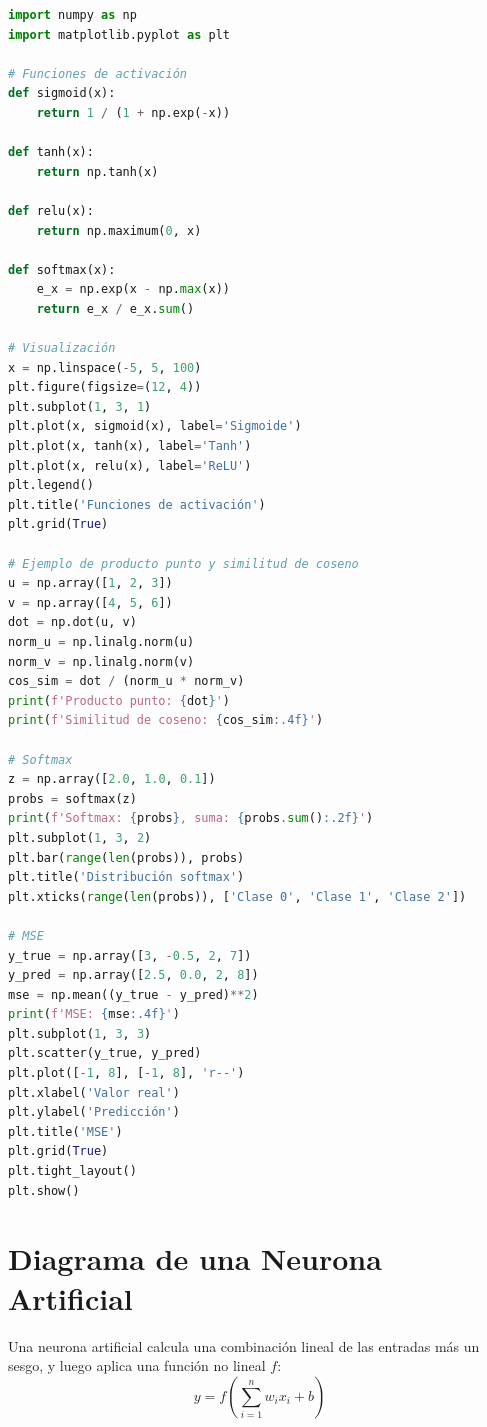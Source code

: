 \documentclass[12pt,a4paper,openany,oneside]{book}
\begin{document}
\begin{lstlisting}[language=Python]
import numpy as np
import matplotlib.pyplot as plt

# Funciones de activación
def sigmoid(x):
    return 1 / (1 + np.exp(-x))

def tanh(x):
    return np.tanh(x)

def relu(x):
    return np.maximum(0, x)

def softmax(x):
    e_x = np.exp(x - np.max(x))
    return e_x / e_x.sum()

# Visualización
x = np.linspace(-5, 5, 100)
plt.figure(figsize=(12, 4))
plt.subplot(1, 3, 1)
plt.plot(x, sigmoid(x), label='Sigmoide')
plt.plot(x, tanh(x), label='Tanh')
plt.plot(x, relu(x), label='ReLU')
plt.legend()
plt.title('Funciones de activación')
plt.grid(True)

# Ejemplo de producto punto y similitud de coseno
u = np.array([1, 2, 3])
v = np.array([4, 5, 6])
dot = np.dot(u, v)
norm_u = np.linalg.norm(u)
norm_v = np.linalg.norm(v)
cos_sim = dot / (norm_u * norm_v)
print(f'Producto punto: {dot}')
print(f'Similitud de coseno: {cos_sim:.4f}')

# Softmax
z = np.array([2.0, 1.0, 0.1])
probs = softmax(z)
print(f'Softmax: {probs}, suma: {probs.sum():.2f}')
plt.subplot(1, 3, 2)
plt.bar(range(len(probs)), probs)
plt.title('Distribución softmax')
plt.xticks(range(len(probs)), ['Clase 0', 'Clase 1', 'Clase 2'])

# MSE
y_true = np.array([3, -0.5, 2, 7])
y_pred = np.array([2.5, 0.0, 2, 8])
mse = np.mean((y_true - y_pred)**2)
print(f'MSE: {mse:.4f}')
plt.subplot(1, 3, 3)
plt.scatter(y_true, y_pred)
plt.plot([-1, 8], [-1, 8], 'r--')
plt.xlabel('Valor real')
plt.ylabel('Predicción')
plt.title('MSE')
plt.grid(True)
plt.tight_layout()
plt.show()
\end{lstlisting}

\section{Diagrama de una Neurona Artificial}
Una neurona artificial calcula una combinación lineal de las entradas más un sesgo, y luego aplica una función no lineal $f$:
\begin{equation*}
y = f\left( \sum_{i=1}^{n} w_i x_i + b \right)
\end{equation*}
\end{document}
